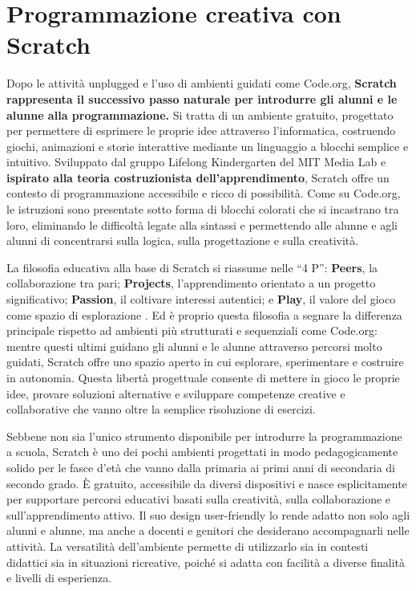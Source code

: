 \chapter{Programmazione creativa con Scratch}\label{capitolo-8-programmazione-creativa-con-scratch}

Dopo le attività unplugged e l'uso di ambienti guidati come Code.org, \textbf{Scratch rappresenta il successivo passo naturale per introdurre gli alunni e le alunne alla programmazione.} Si tratta di un ambiente gratuito, progettato per permettere di esprimere le proprie idee attraverso l'informatica, costruendo giochi, animazioni e storie interattive mediante un linguaggio a blocchi semplice e intuitivo. Sviluppato dal gruppo Lifelong Kindergarten del MIT Media Lab e \textbf{ispirato alla teoria costruzionista dell'apprendimento}, Scratch offre un contesto di programmazione accessibile e ricco di possibilità. Come su Code.org, le istruzioni sono presentate sotto forma di blocchi colorati che si incastrano tra loro, eliminando le difficoltà legate alla sintassi e permettendo alle alunne e agli alunni di concentrarsi sulla logica, sulla progettazione e sulla creatività.

La filosofia educativa alla base di Scratch si riassume nelle ``4 P'': \textbf{Peers}, la collaborazione tra pari; \textbf{Projects}, l'apprendimento orientato a un progetto significativo; \textbf{Passion}, il coltivare interessi autentici; e \textbf{Play}, il valore del gioco come spazio di esplorazione \parencite{resnick-2018}. Ed è proprio questa filosofia a segnare la differenza principale rispetto ad ambienti più strutturati e sequenziali come Code.org: mentre questi ultimi guidano gli alunni e le alunne attraverso percorsi molto guidati, Scratch offre uno spazio aperto in cui esplorare, sperimentare e costruire in autonomia. Questa libertà progettuale consente di mettere in gioco le proprie idee, provare soluzioni alternative e sviluppare competenze creative e collaborative che vanno oltre la semplice risoluzione di esercizi.

Sebbene non sia l'unico strumento disponibile per introdurre la programmazione a scuola, Scratch è uno dei pochi ambienti progettati in modo pedagogicamente solido per le fasce d'età che vanno dalla primaria ai primi anni di secondaria di secondo grado. È gratuito, accessibile da diversi dispositivi e nasce esplicitamente per supportare percorsi educativi basati sulla creatività, sulla collaborazione e sull'apprendimento attivo. Il suo design user-friendly lo rende adatto non solo agli alunni e alunne, ma anche a docenti e genitori che desiderano accompagnarli nelle attività. La versatilità dell'ambiente permette di utilizzarlo sia in contesti didattici sia in situazioni ricreative, poiché si adatta con facilità a diverse finalità e livelli di esperienza.

